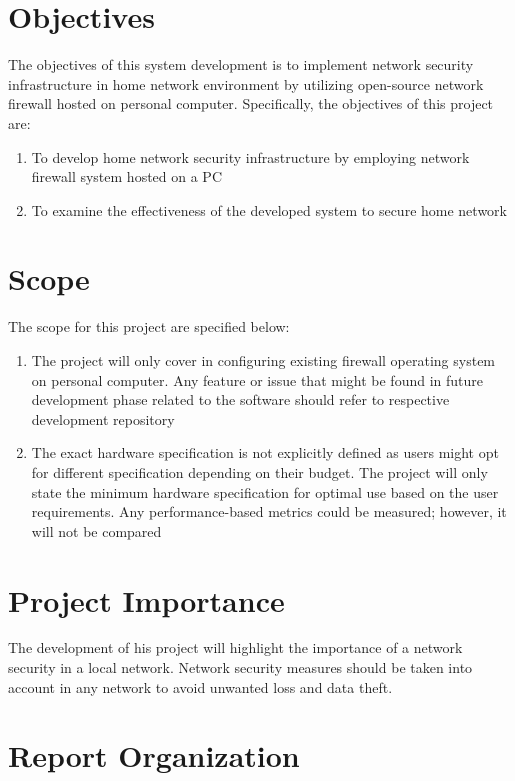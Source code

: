 \documentclass[../index.tex]{subfiles}
\begin{document}
\section{Objectives}

The objectives of this system development is to implement network security infrastructure in home network environment by utilizing open-source network firewall hosted on personal computer. Specifically, the objectives of this project are:

\begin{enumerate}
	\item To develop home network security infrastructure by employing network firewall system hosted on a PC
	\item To examine the effectiveness of the developed system to secure home network
\end{enumerate}

\section{Scope}

The scope for this project are specified below:

\begin{enumerate}
	\item The project will only cover in configuring existing firewall operating system on personal computer. Any feature or issue that might be found in future development phase related to the software should refer to respective development repository
	\item The exact hardware specification is not explicitly defined as users might opt for different specification depending on their budget. The project will only state the minimum hardware specification for optimal use based on the user requirements. Any performance-based metrics could be measured; however, it will not be compared

\end{enumerate}

\section{Project Importance}
The development of his project will highlight the importance of a network security in a local network. Network security measures should be taken into account in any network to avoid unwanted loss and data theft.

\section{Report Organization}
\end{document}
